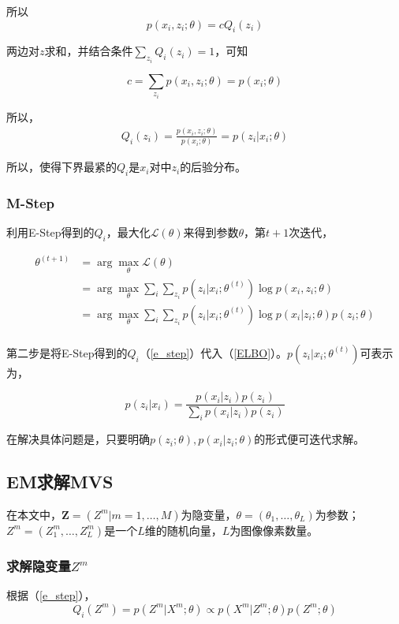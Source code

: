 		所以
		$$
			p(x_i,z_i;\theta) = c Q_i(z_i)
		$$

		两边对$z$求和，并结合条件$\sum_{z_i} Q_i(z_i) = 1$，可知

		$$
			c = \sum_{z_i} p(x_i,z_i;\theta) = p(x_i;\theta)
		$$

		所以，
		\begin{align}
			Q_i(z_i) = \frac{p(x_i,z_i;\theta)}{p(x_i;\theta)} = p(z_i|x_i;\theta)
		\end{align}\label{e_step}

		所以，使得下界最紧的$Q_i$是$x_i$对中$z_i$的后验分布。
	\subsubsection*{M-Step}
		利用E-Step得到的$Q_i$，最大化$\mathcal{L}(\theta)$来得到参数$\theta$，第$t+1$次迭代，

		\begin{align}
			\theta^{(t+1)} &= \arg\max_\theta \mathcal{L}(\theta)\\
				&= \arg\max_\theta \sum_i \sum_{z_i} p(z_i|x_i;\theta^{(t)})\log p(x_i,z_i;\theta)\\
				&= \arg\max_\theta \sum_i \sum_{z_i} p(z_i|x_i;\theta^{(t)})\log p(x_i|z_i;\theta)p(z_i;\theta)\label{theta_eq}\\
		\end{align}

		第二步是将E-Step得到的$Q_i$（\ref{e_step}）代入（\ref{ELBO}）。$p(z_i|x_i;\theta^{(t)})$可表示为，

		$$
			p(z_i|x_i) = \frac{p(x_i|z_i)p(z_i)}{\sum_i p(x_i|z_i)p(z_i)}
		$$

		在解决具体问题是，只要明确$p(z_i;\theta),p(x_i|z_i;\theta)$的形式便可迭代求解。

\subsection{EM求解MVS}
		在本文中，$\mathbf{Z}= (Z^m|m=1,\dots,M)$为隐变量，$\theta = (\theta_1,\dots,\theta_L)$为参数；\\

		$Z^m = (Z^m_1,\dots,Z^m_L)$是一个$L$维的随机向量，$L$为图像像素数量。\\

	\subsubsection*{求解隐变量$Z^m$}

		根据（\ref{e_step}），
		$$
			Q_i(Z^m) = p(Z^m|X^m;\theta) \propto p(X^m|Z^m;\theta)p(Z^m;\theta)
		$$

